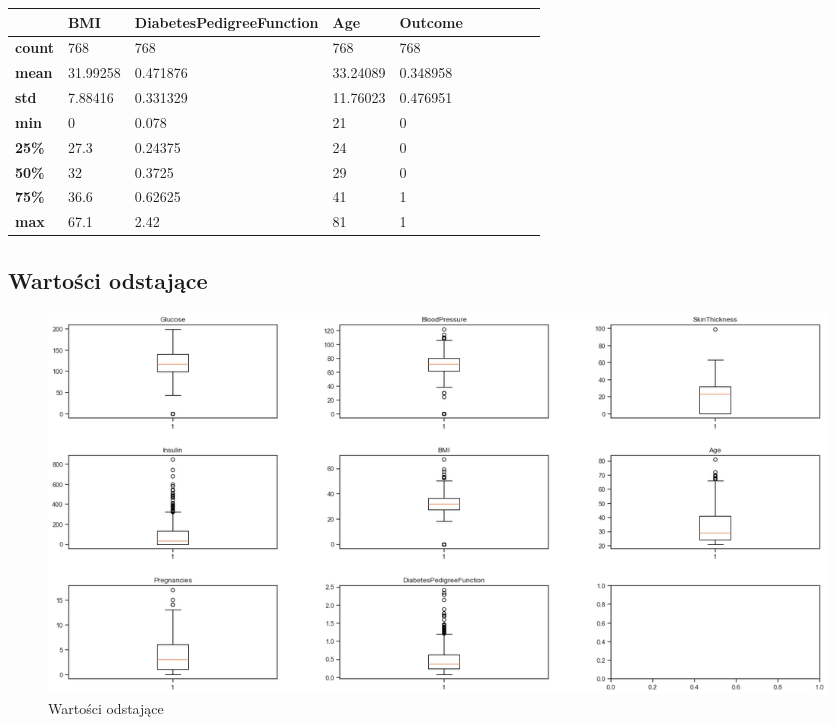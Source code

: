 \documentclass[12pt]{article}
\begin{document}
\begin{table}[]
\begin{tabular}{@{}llllllllll@{}}
\toprule
               & \textbf{BMI} & \textbf{DiabetesPedigreeFunction} & \textbf{Age} & \textbf{Outcome} & \textbf{} &  &  &  &  \\ \midrule
\textbf{count} & 768          & 768                               & 768          & 768              &           &  &  &  &  \\
\textbf{mean}  & 31.99258     & 0.471876                          & 33.24089     & 0.348958         &           &  &  &  &  \\
\textbf{std}   & 7.88416      & 0.331329                          & 11.76023     & 0.476951         &           &  &  &  &  \\
\textbf{min}   & 0            & 0.078                             & 21           & 0                &           &  &  &  &  \\
\textbf{25\%}  & 27.3         & 0.24375                           & 24           & 0                &           &  &  &  &  \\
\textbf{50\%}  & 32           & 0.3725                            & 29           & 0                &           &  &  &  &  \\
\textbf{75\%}  & 36.6         & 0.62625                           & 41           & 1                &           &  &  &  &  \\
\textbf{max}   & 67.1         & 2.42                              & 81           & 1                &           &  &  &  &  \\ \bottomrule
\end{tabular}
\end{table}

\subsection{Wartości odstające}

\begin{figure}
	\centering
	\includegraphics[width=1.2\textwidth]{images/outliers.png}
	\caption{Wartości odstające}
	\label{fig:outliers}
\end{figure}
\end{document}
